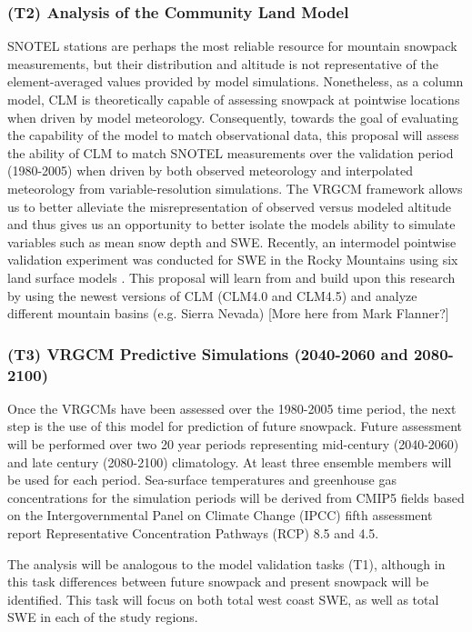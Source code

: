 \documentclass[11pt]{article}
\begin{document}
\subsubsection{(T2) Analysis of the Community Land Model}

SNOTEL stations are perhaps the most reliable resource for mountain snowpack measurements, but their distribution and altitude is not representative of the element-averaged values provided by model simulations.  Nonetheless, as a column model, CLM is theoretically capable of assessing snowpack at pointwise locations when driven by model meteorology.  Consequently, towards the goal of evaluating the capability of the model to match observational data, this proposal will assess the ability of CLM to match SNOTEL measurements over the validation period (1980-2005) when driven by both observed meteorology and interpolated meteorology from variable-resolution simulations.  The VRGCM framework allows us to better alleviate the misrepresentation of observed versus modeled altitude and thus gives us an opportunity to better isolate the models ability to simulate variables such as mean snow depth and SWE.  Recently, an intermodel pointwise validation experiment was conducted for SWE in the Rocky Mountains using six land surface models \citep{chen2014modeling}.  This proposal will learn from and build upon this research by using the newest versions of CLM (CLM4.0 and CLM4.5) and analyze different mountain basins (e.g. Sierra Nevada) {\color{red} [More here from Mark Flanner?]}

\subsubsection{(T3) VRGCM Predictive Simulations (2040-2060 and 2080-2100)}

Once the VRGCMs have been assessed over the 1980-2005 time period, the next step is the use of this model for prediction of future snowpack.  Future assessment will be performed over two 20 year periods representing mid-century (2040-2060) and late century (2080-2100) climatology.  At least three ensemble members will be used for each period.  Sea-surface temperatures and greenhouse gas concentrations for the simulation periods will be derived from CMIP5 fields based on the Intergovernmental Panel on Climate Change (IPCC) fifth assessment report Representative Concentration Pathways (RCP) 8.5 and 4.5.

The analysis will be analogous to the model validation tasks (T1), although in this task differences between future snowpack and present snowpack will be identified.  This task will focus on both total west coast SWE, as well as total SWE in each of the study regions.
\end{document}
